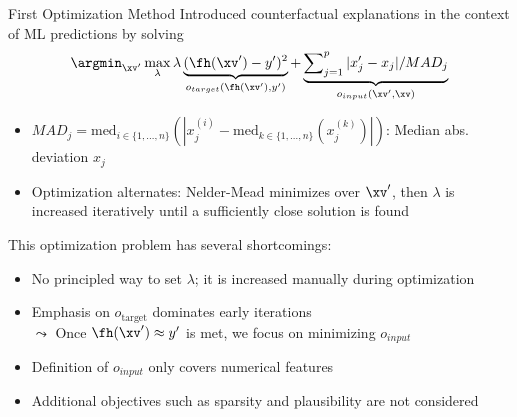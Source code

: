 \documentclass[11pt,compress,t,notes=noshow, aspectratio=169, xcolor=table]{beamer}
\begin{document}
\begin{frame}{First Optimization Method }
Introduced counterfactual explanations in the context of ML predictions by solving
		\begin{equation}
			\argmin_{\xv'} \max_{\lambda} \lambda \underbrace{(\fh(\xv') - y')^2}_{o_{target}(\fh(\xv'), y')} + \underbrace{\sum\nolimits_{j = 1}^p |x'_j - x_j|/MAD_j}_{o_{input}(\xv', \xv)}
		\end{equation}
\begin{itemize}
  \item $MAD_j = \text{med}_{i \in \{1, \dots, n\}} \left( | x^{(i)}_j - \text{med}_{k\in \{1, \dots, n\}} (x^{(k)}_j) | \right)$: Median abs. deviation $x_j$
  \item Optimization alternates: Nelder-Mead minimizes over $\xv'$, then $\lambda$ is increased iteratively until a sufficiently close solution is found
\end{itemize}
	
	
	This optimization problem has several shortcomings: 	
	\begin{itemize}%
		\item No principled way to set $\lambda$; it is increased manually during optimization %
		\item Emphasis on $o_{\text{target}}$ dominates early iterations\\%
		$\leadsto$ Once $\fh(\xv') \approx y'$ is met, we focus on minimizing $o_{input}$ 
		\item Definition of $o_{input}$ only covers numerical features 
		\item Additional objectives such as sparsity and plausibility are not considered
	\end{itemize}
	


\end{frame}
\end{document}
